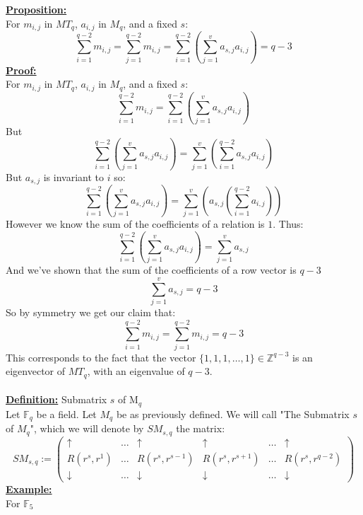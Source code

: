 \documentclass[11pt]{article}
\theoremstyle{plain}
\theoremstyle{definition}
\begin{document}
\textbf{\underline{Proposition:}} \\
For $m_{i,j}$ in $MT_q$, $a_{i,j}$ in $M_q$, and a fixed $s$:
\begin{equation*}
\sum\limits_{i=1}^{q-2} m_{i,j} = \sum\limits_{j=1}^{q-2} m_{i,j} = \sum\limits_{i=1}^{q-2} (\sum\limits_{j=1}^{v} a_{s,j} a_{i,j} ) = q-3
\end{equation*}
\textbf{\underline{Proof:}} \\
For $m_{i,j}$ in $MT_q$, $a_{i,j}$ in $M_q$, and a fixed $s$:
\begin{equation*}
\sum\limits_{i=1}^{q-2} m_{i,j} = \sum\limits_{i=1}^{q-2} (\sum\limits_{j=1}^{v} a_{s,j} a_{i,j} ) 
\end{equation*}
But
\begin{equation*}
\sum\limits_{i=1}^{q-2} (\sum\limits_{j=1}^{v} a_{s,j} a_{i,j} ) = \sum\limits_{j=1}^{v} (\sum\limits_{i=1}^{q-2} a_{s,j} a_{i,j} )
\end{equation*}
But $a_{s,j}$ is invariant to $i$ so:
\begin{equation*}
\sum\limits_{i=1}^{q-2} (\sum\limits_{j=1}^{v} a_{s,j} a_{i,j} ) = \sum\limits_{j=1}^{v}  (a_{s,j} (\sum\limits_{i=1}^{q-2} a_{i,j} ))
\end{equation*}
However we know the sum of the coefficients of a relation is $1$. Thus:
\begin{equation*}
\sum\limits_{i=1}^{q-2} (\sum\limits_{j=1}^{v} a_{s,j} a_{i,j} ) = \sum\limits_{j=1}^{v}  a_{s,j} 
\end{equation*}
And we've shown that the sum of the coefficients of a row vector is $q-3$
\begin{equation*}
 \sum\limits_{j=1}^{v}  a_{s,j} = q-3 
\end{equation*}
So by symmetry we get our claim that:
\begin{equation*}
\sum\limits_{i=1}^{q-2} m_{i,j} = \sum\limits_{j=1}^{q-2} m_{i,j} = q-3
\end{equation*}
This corresponds to the fact that the vector $\{1,1,1,\ldots,1\} \in \mathbb{Z}^{q-3}$ is an eigenvector of $MT_q$, with an eigenvalue of $q-3$.\\
\\
\textbf{\underline{Definition:}} Submatrix $s$ of M$_q$\\
Let $\mathbb{F}_q$ be a field. Let $M_q$ be as previously defined. We will call "The Submatrix $s$ of $M_q$", which we will denote by $SM_{s,q}$ the matrix: \\

\[ SM_{s,q} := \left( \begin{array}{cccccc}
	\uparrow  & \dots  & \uparrow & \uparrow  & \dots  & \uparrow\\
	R(r^s, r^1) &   \dots & R(r^s, r^{s-1}) &    R(r^s, r^{s+1}) &   \dots &  R(r^s, r^{q-2})  \\
	\downarrow  & \dots  & \downarrow & \downarrow  & \dots  & \downarrow   \end{array} \right)\] 
\textbf{\underline{Example:}}\\
 For $\mathbb{F}_5$\\
\end{document}
